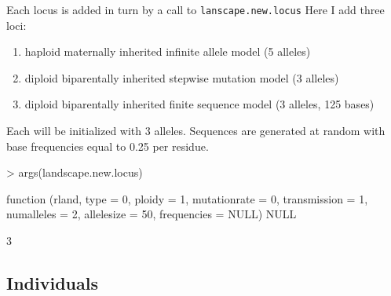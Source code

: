 \documentclass[10pt]{article}
\newcommand{\code}[1]{\texttt{#1}}
\begin{document}
Each locus is added in turn by a call to \code{lanscape.new.locus}
Here I add three loci:
\begin{enumerate}
\item haploid maternally inherited infinite allele model (5 alleles)
\item diploid biparentally inherited stepwise mutation model (3 alleles)
\item diploid biparentally inherited finite sequence model (3 alleles, 125 bases)
\end{enumerate}
Each will be initialized with 3 alleles.  Sequences are generated at random with base frequencies equal to 0.25 per residue.
\begin{Schunk}
\begin{Sinput}
> args(landscape.new.locus)
\end{Sinput}
\begin{Soutput}
function (rland, type = 0, ploidy = 1, mutationrate = 0, transmission = 1, 
    numalleles = 2, allelesize = 50, frequencies = NULL) 
NULL
\end{Soutput}
\begin{Soutput}
[1] 3
\end{Soutput}
\end{Schunk}

\subsection{Individuals}
\label{sec:individuals}
\end{document}
